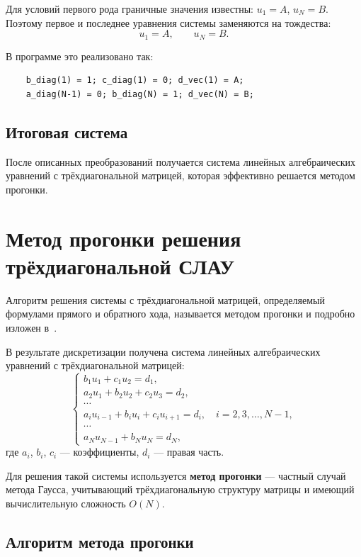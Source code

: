 \documentclass[14pt,a4paper]{extarticle}  %
\numberwithin{equation}{section}
\begin{document}
Для условий первого рода граничные значения известны: \(u_1 = A\), \(u_N = B\). 
Поэтому первое и последнее уравнения системы заменяются на тождества:
\[
u_1 = A, \qquad u_N = B.
\]

В программе это реализовано так:

\begin{verbatim}
    b_diag(1) = 1; c_diag(1) = 0; d_vec(1) = A;
    a_diag(N-1) = 0; b_diag(N) = 1; d_vec(N) = B;
\end{verbatim}

\subsection{Итоговая система}

После описанных преобразований получается система линейных алгебраических 
уравнений с трёхдиагональной матрицей, которая эффективно решается 
методом прогонки.

\newpage
\section{Метод прогонки решения трёхдиагональной СЛАУ}

Алгоритм решения системы с трёхдиагональной матрицей, определяемый 
формулами прямого и обратного хода, называется методом прогонки 
и подробно изложен в~\cite{samarskii_gulin_1989}.

В результате дискретизации получена система линейных алгебраических уравнений 
с трёхдиагональной матрицей:
\[
\begin{cases}
b_1 u_1 + c_1 u_2 = d_1, \\
a_2 u_1 + b_2 u_2 + c_2 u_3 = d_2, \\
\cdots \\
a_{i} u_{i-1} + b_i u_i + c_i u_{i+1} = d_i, \quad i = 2, 3, \dots, N-1, \\
\cdots \\
a_{N} u_{N-1} + b_N u_N = d_N,
\end{cases}
\]
где \(a_i\), \(b_i\), \(c_i\) — коэффициенты, \(d_i\) — правая часть.

Для решения такой системы используется \textbf{метод прогонки} — 
частный случай метода Гаусса, учитывающий трёхдиагональную структуру 
матрицы и имеющий вычислительную сложность \(O(N)\).

\subsection{Алгоритм метода прогонки}
\end{document}
